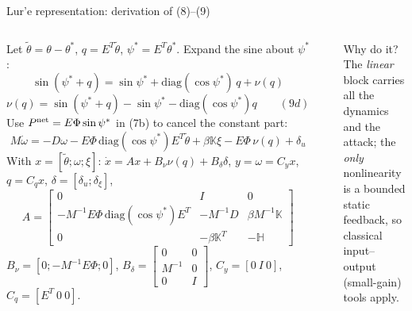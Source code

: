 \documentclass[aspectratio=169,9pt]{beamer}
\newcommand{\bbK}{\mathbb{K}}
\newcommand{\bbH}{\mathbb{H}}
\begin{document}
\begin{frame}[t]{Lur'e representation: derivation of (8)--(9)}
\footnotesize
\begin{columns}[T]
Let $\tilde\theta=\theta-\theta^*$, $q=E^T\tilde\theta$, $\psi^*=E^T\theta^*$. Expand the sine about $\psi^*$:
\[\sin(\psi^*+q)=\sin\psi^*+\mathrm{diag}(\cos\psi^*)\,q+\nu(q)\]
\[\nu(q)=\sin(\psi^*+q)-\sin\psi^*-\mathrm{diag}(\cos\psi^*)q\qquad(9d)\]
Use $P^{\rm net}=E\Phi\sin\psi^*$ in (7b) to cancel the constant part:
\[M\dot\omega=-D\omega-E\Phi\,\mathrm{diag}(\cos\psi^*)E^T\tilde\theta+\beta\bbK\xi-E\Phi\,\nu(q)+\delta_u\]
With $x=[\tilde\theta;\omega;\xi]$: $\dot x=Ax+B_\nu\nu(q)+B_\delta\delta$, $y=\omega=C_yx$, $q=C_qx$, $\delta=[\delta_u;\delta_\xi]$,
\[A=\begin{bmatrix}0&I&0\\-M^{-1}E\Phi\,\mathrm{diag}(\cos\psi^*)E^T&-M^{-1}D&\beta M^{-1}\bbK\\0&-\beta\bbK^T&-\bbH\end{bmatrix}\]
$B_\nu=[0;-M^{-1}E\Phi;0]$, $B_\delta=\begin{bmatrix}0&0\\M^{-1}&0\\0&I\end{bmatrix}$, $C_y=[0\ I\ 0]$, $C_q=[E^T\ 0\ 0]$.
\begin{center}
\end{center}
\begin{block}{Why do it?}
The \emph{linear} block carries all the dynamics and the attack; the \emph{only} nonlinearity is a bounded static feedback, so classical input--output (small-gain) tools apply.
\end{block}
\end{columns}
\end{frame}
\end{document}
